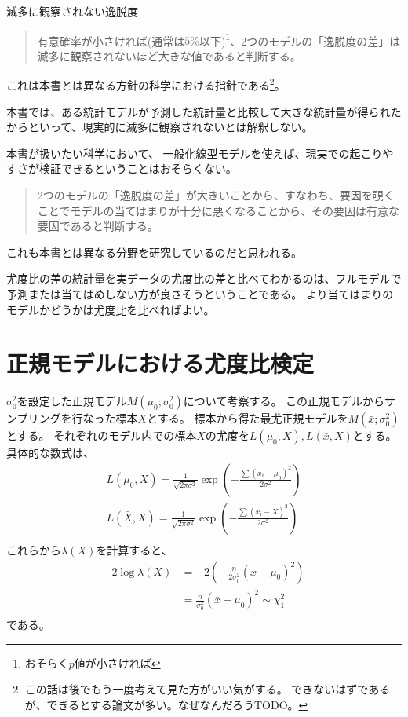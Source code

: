 \begin{SMbox}{滅多に観察されない逸脱度}
\begin{quote}
    有意確率が小さければ(通常は$5\%$以下)\footnote{おそらく$p$値が小さければ}、2つのモデルの「逸脱度の差」は滅多に観察されないほど大きな値であると判断する。
\end{quote}
    これは本書とは異なる方針の科学における指針である\footnote{
        この話は後でもう一度考えて見た方がいい気がする。
        できないはずであるが、できるとする論文が多い。なぜなんだろうTODO。
    }。

    本書では、ある統計モデルが予測した統計量と比較して大きな統計量が得られたからといって、現実的に滅多に観察されないとは解釈しない。

    本書が扱いたい科学において、
    一般化線型モデルを使えば、現実での起こりやすさが検証できるということはおそらくない。
\begin{quote}
    2つのモデルの「逸脱度の差」が大きいことから、すなわち、要因を覗くことでモデルの当てはまりが十分に悪くなることから、その要因は有意な要因であると判断する。
\end{quote}
    これも本書とは異なる分野を研究しているのだと思われる。

    尤度比の差の統計量を実データの尤度比の差と比べてわかるのは、フルモデルで予測または当てはめしない方が良さそうということである。
    より当てはまりのモデルかどうかは尤度比を比べればよい。
\end{SMbox}

\section{正規モデルにおける尤度比検定}

$\sigma^2_0$を設定した正規モデル$M(\mu_0;\sigma^2_0)$について考察する。
この正規モデルからサンプリングを行なった標本$X$とする。
標本から得た最尤正規モデルを$M(\bar{x};\sigma^2_0)$とする。
それぞれのモデル内での標本$X$の尤度を$L(\mu_0,X),L(\bar{x},X)$とする。
具体的な数式は、
\begin{align}
    L(\mu_0,X)=\frac{1}{\sqrt{2\pi\sigma^2}}\exp(-\frac{\sum(x_i-\mu_0)^2}{2\sigma^2})\\
    L(\bar{X},X)=\frac{1}{\sqrt{2\pi\sigma^2}}\exp(-\frac{\sum(x_i-\bar{X})^2}{2\sigma^2})\\
\end{align}
これらから$\lambda(X)$を計算すると、
\begin{align}
    -2\log\lambda(X) &= -2(-\frac{n}{2\sigma^2_0}(\bar{x}-\mu_0)^2) \\
    &= \frac{n}{\sigma^2_0}(\bar{x}-\mu_0)^2 \sim \chi^2_1 \\
\end{align}
である。

